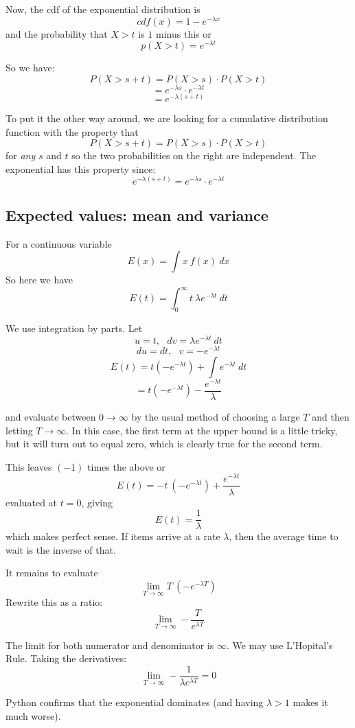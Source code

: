 \documentclass[11pt, oneside]{article}   	%
\begin{document}
Now, the cdf of the exponential distribution is
\[ cdf(x) = 1 - e^{-\lambda x} \]
and the probability that $X > t$ is $1$ minus this or
\[ p(X > t) = e^{-\lambda t} \]

So we have:
\[ P(X > s+t) = P(X > s) \cdot P(X > t) \]
\[ = e^{-\lambda s} \cdot e^{-\lambda t} \]
\[ = e^{-\lambda (s+t)} \]

To put it the other way around, we are looking for a cumulative distribution function with the property that 
\[ P(X > s+t) = P(X > s) \cdot P(X > t) \]
for \emph{any} $s$ and $t$ so the two probabilities on the right are independent.  The exponential has this property since:
\[ e^{-\lambda (s+t)} = e^{-\lambda s} \cdot e^{-\lambda t} \]

\subsection*{Expected values:  mean and variance}
For a continuous variable
\[ E(x) = \int x \ f(x) \ dx \]
So here we have
\[ E(t) = \int_0^{\infty} t \ \lambda e^{-\lambda t} \ dt \]

We use integration by parts.  Let
\[ u = t, \ \ \ dv = \lambda e^{-\lambda t} \ dt \]
\[ du = dt, \ \ \ v = -e^{-\lambda t} \]
\[ E(t) = t (-e^{-\lambda t}) + \int e^{-\lambda t} \ dt \]
\[ = t (-e^{-\lambda t}) - \frac{e^{-\lambda t}}{\lambda} \]

and evaluate between $0 \rightarrow \infty$ by the usual method of choosing a large $T$ and then letting $T \rightarrow \infty$.  In this case, the first term at the upper bound is a little tricky, but it will turn out to equal zero, which is clearly true for the second term.  

This leaves $(-1)$ times the above or
\[ E(t) = - t \ (-e^{-\lambda t}) + \frac{e^{-\lambda t}}{\lambda} \]
evaluated at $t = 0$, giving
\[ E(t) = \frac{1}{\lambda} \]
which makes perfect sense.  If items arrive at a rate $\lambda$, then the average time to wait is the inverse of that.

It remains to evaluate
\[ \lim_{T \rightarrow \infty}  T \ (-e^{-\lambda T}) \]
Rewrite this as a ratio:
\[ \lim_{T \rightarrow \infty}  -\frac{T}{e^{\lambda T}} \]

The limit for both numerator and denominator is $\infty$.  We may use L'Hopital's Rule.  Taking the derivatives:
\[ \lim_{T \rightarrow \infty}  -\frac{1}{\lambda e^{\lambda T}}  = 0\]

Python confirms that the exponential dominates (and having $\lambda > 1$ makes it much worse).
\end{document}
